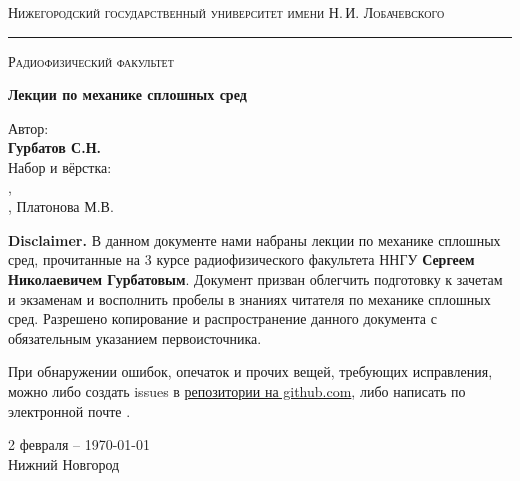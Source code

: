 \begin{titlepage}
\thispagestyle{empty}

\begin{center}
	{\small\textsc{Нижегородский государственный университет имени Н.\,И. Лобачевского}}
	\vskip 3pt \hrule \vskip 5pt
	{\small\textsc{Радиофизический факультет}}

	\vfill

	\begin{spacing}{2}
	{\Huge \bf  Лекции по механике сплошных сред}\\%
	\end{spacing}
	\vspace{1em}
	{ Автор:}\\[.25em]
	{\textbf{Гурбатов С.Н.}}\\[.7em]
	{ Набор и вёрстка:}\\[.5em]
	{ 	\href{https://github.com/fedorsarafanov}{\color{black}{Сарафанов Ф.Г.}}, \\
		\href{https://github.com/greengrocer98}{\color{black}{Есюнин М.В.}},
	 Платонова М.В.}\\[2em]
	\vspace{1em}
\end{center}

\textbf{Disclaimer.} В данном документе нами набраны лекции по механике сплошных сред, прочитанные на 3 курсе радиофизического факультета ННГУ \textbf{Сергеем Николаевичем Гурбатовым}. Документ призван облегчить подготовку к зачетам и экзаменам и восполнить пробелы в знаниях читателя по механике сплошных сред. Разрешено копирование и распространение данного документа с обязательным указанием первоисточника. 

При обнаружении ошибок, опечаток и прочих вещей, требующих исправления, можно либо создать issues в \href{https://github.com/FedorSarafanov/continuum-mechanics}{репозитории на github.com}, либо написать по электронной почте  \href{mailto:sfg180@yandex.ru}{\color{black}{sfg180@yandex.ru}}.

\begin{center}
	\vfill
	2 февраля -- \today\\Нижний Новгород
\end{center}

\end{titlepage}